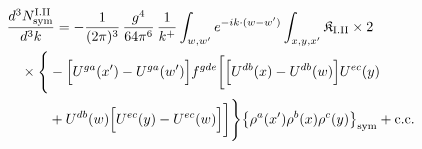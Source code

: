 \begingroup\small
\begin{align}\label{eq:H-I.II-3}
&\frac{d^{3}N^{\rm I.II}_{{\rm sym}}}{d^{3}k}=-\frac{1}{(2\pi)^{3}}\, \frac{g^{4}}{64\pi^{6}}\, \frac{1}{k^{+}} \int_{w,w'}e^{-ik\cdot(w-w')} \int_{x,y,x'} \mathfrak{K}_{\rm I.II} \times 2\notag\\
&\quad \times \Bigg\{-\Big[U^{ga}(x')-U^{ga}(w')\Big]f^{gde}\bigg[\Big[U^{db}(x)-U^{db}(w)\Big]U^{ec}(y)\notag\\
&\quad\quad\quad +U^{db}(w)\Big[U^{ec}(y)-U^{ec}(w)\Big]\bigg]\Bigg\}\big\{\rho^{a}(x')\rho^{b}(x)\rho^{c}(y)\big\}_{\rm sym} +{\rm c.c.}
\end{align}
\endgroup
